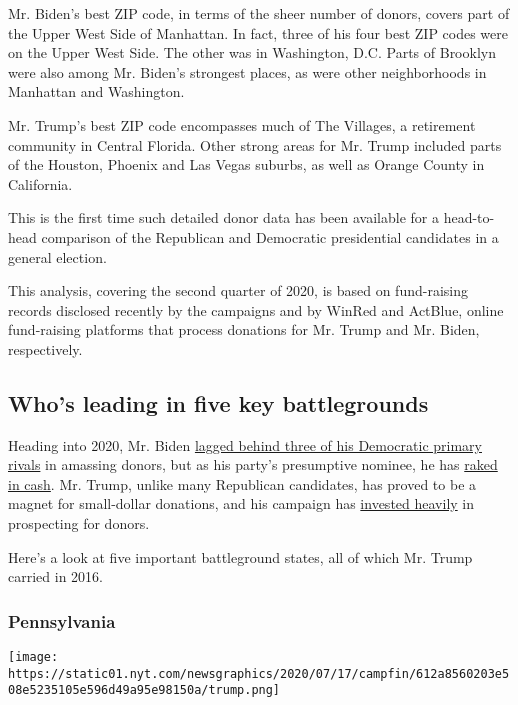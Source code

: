 Mr. Biden's best ZIP code, in terms of the sheer number of donors,
covers part of the Upper West Side of Manhattan. In fact, three of his
four best ZIP codes were on the Upper West Side. The other was in
Washington, D.C. Parts of Brooklyn were also among Mr. Biden's strongest
places, as were other neighborhoods in Manhattan and Washington.

Mr. Trump's best ZIP code encompasses much of The Villages, a retirement
community in Central Florida. Other strong areas for Mr. Trump included
parts of the Houston, Phoenix and Las Vegas suburbs, as well as Orange
County in California.

This is the first time such detailed donor data has been available for a
head-to-head comparison of the Republican and Democratic presidential
candidates in a general election.

This analysis, covering the second quarter of 2020, is based on
fund-raising records disclosed recently by the campaigns and by WinRed
and ActBlue, online fund-raising platforms that process donations for
Mr. Trump and Mr. Biden, respectively.

\hypertarget{whos-leading-in-five-key-battlegrounds}{%
\subsection{Who's leading in five key
battlegrounds}\label{whos-leading-in-five-key-battlegrounds}}

Heading into 2020, Mr. Biden
\href{https://www.nytimes.com/interactive/2020/02/01/us/politics/democratic-presidential-campaign-donors.html}{lagged
behind three of his Democratic primary rivals} in amassing donors, but
as his party's presumptive nominee, he has
\href{https://www.nytimes.com/2020/06/23/us/politics/biden-trump-2020-fundraising.html}{raked
in cash}. Mr. Trump, unlike many Republican candidates, has proved to be
a magnet for small-dollar donations, and his campaign has
\href{https://www.nytimes.com/2019/07/16/us/politics/trump-campaign-donations.html}{invested
heavily} in prospecting for donors.

Here's a look at five important battleground states, all of which Mr.
Trump carried in 2016.

\hypertarget{pennsylvania}{%
\subsubsection{Pennsylvania}\label{pennsylvania}}

\texttt{[image: https://static01.nyt.com/newsgraphics/2020/07/17/campfin/612a8560203e508e5235105e596d49a95e98150a/trump.png]}

